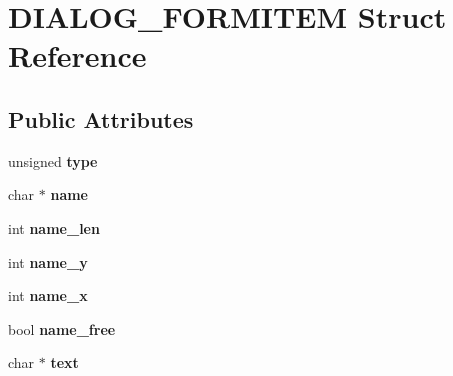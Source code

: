 \hypertarget{struct_d_i_a_l_o_g___f_o_r_m_i_t_e_m}{}\section{D\+I\+A\+L\+O\+G\+\_\+\+F\+O\+R\+M\+I\+T\+EM Struct Reference}
\label{struct_d_i_a_l_o_g___f_o_r_m_i_t_e_m}
\subsection*{Public Attributes}
\begin{DoxyCompactItemize}
\item 
unsigned {\bfseries type}\hypertarget{struct_d_i_a_l_o_g___f_o_r_m_i_t_e_m_a8ff87668483d299d214cd8b3483d64bb}{}\label{struct_d_i_a_l_o_g___f_o_r_m_i_t_e_m_a8ff87668483d299d214cd8b3483d64bb}

\item 
char $\ast$ {\bfseries name}\hypertarget{struct_d_i_a_l_o_g___f_o_r_m_i_t_e_m_a399b19535ef78c5d8ba35e32ff90842a}{}\label{struct_d_i_a_l_o_g___f_o_r_m_i_t_e_m_a399b19535ef78c5d8ba35e32ff90842a}

\item 
int {\bfseries name\+\_\+len}\hypertarget{struct_d_i_a_l_o_g___f_o_r_m_i_t_e_m_a68fa14589b9a6e25c4b841ee1f546f45}{}\label{struct_d_i_a_l_o_g___f_o_r_m_i_t_e_m_a68fa14589b9a6e25c4b841ee1f546f45}

\item 
int {\bfseries name\+\_\+y}\hypertarget{struct_d_i_a_l_o_g___f_o_r_m_i_t_e_m_a0b6d9a0df894b92a40079e5e2833d44d}{}\label{struct_d_i_a_l_o_g___f_o_r_m_i_t_e_m_a0b6d9a0df894b92a40079e5e2833d44d}

\item 
int {\bfseries name\+\_\+x}\hypertarget{struct_d_i_a_l_o_g___f_o_r_m_i_t_e_m_a6a7f8857a6f2708368bb4749b339f6d6}{}\label{struct_d_i_a_l_o_g___f_o_r_m_i_t_e_m_a6a7f8857a6f2708368bb4749b339f6d6}

\item 
bool {\bfseries name\+\_\+free}\hypertarget{struct_d_i_a_l_o_g___f_o_r_m_i_t_e_m_a8c759d13ca1affacef48657daa4d08ce}{}\label{struct_d_i_a_l_o_g___f_o_r_m_i_t_e_m_a8c759d13ca1affacef48657daa4d08ce}

\item 
char $\ast$ {\bfseries text}\hypertarget{struct_d_i_a_l_o_g___f_o_r_m_i_t_e_m_a5c23c84c7379a216a0ba65f1e893affe}{}\label{struct_d_i_a_l_o_g___f_o_r_m_i_t_e_m_a5c23c84c7379a216a0ba65f1e893affe}


\end{DoxyCompactItemize}
